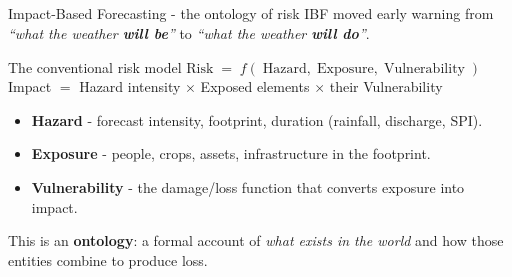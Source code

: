 \documentclass[aspectratio=3218]{beamer}
\begin{document}
\subsection*{}

\begin{frame}{Impact-Based Forecasting - the ontology of risk}
	IBF moved early warning from \emph{``what the weather \textbf{will be}''} to
	\emph{``what the weather \textbf{will do}''}.
	\begin{block}{The conventional risk model}
		\centering\large
		$\mathrm{Risk} \;=\; f(\;\mathrm{Hazard},\; \mathrm{Exposure},\;
		\mathrm{Vulnerability}\;)$ \\[0.6ex]
		\normalsize Impact $=$ Hazard intensity $\times$ Exposed elements
		$\times$ their Vulnerability
	\end{block}
	\begin{itemize}
		\item \textbf{Hazard} - forecast intensity, footprint, duration
			(rainfall, discharge, SPI).
		\item \textbf{Exposure} - people, crops, assets, infrastructure in the
			footprint.
		\item \textbf{Vulnerability} - the damage/loss function that converts
			exposure into impact.
	\end{itemize}
	\centering
	This is an \textbf{ontology}: a formal account of \emph{what exists in the
	world} and how those entities combine to produce loss.
\end{frame}
\end{document}
